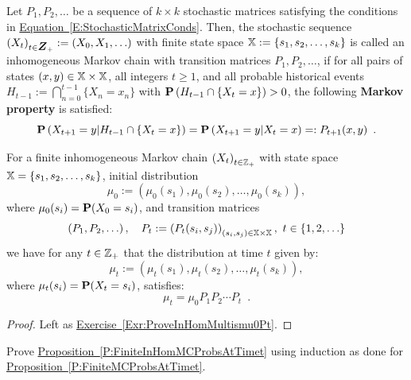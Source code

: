 \begin{definition}\label{D:TimeInhomFiniteMC}
Let $P_1,P_2,\ldots$ be a sequence of $k \times k$ stochastic matrices satisfying the conditions in \hyperref[E:StochasticMatrixConds]{Equation~\ref*{E:StochasticMatrixConds}}.  Then, the stochastic sequence $\left( X_t \right)_{t \in \Z_+} := (X_0,X_1,\ldots)$ with finite state space $\mathbb{X} := \{s_1,s_2,\ldots,s_k\}$ is called an inhomogeneous Markov chain with transition matrices $P_1,P_2,\ldots$, if for all pairs of states $(x,y) \in \mathbb{X} \times \mathbb{X}$, all integers $t \geq 1$, and all probable historical events $H_{t-1} := \bigcap_{n=0}^{t-1} \{ X_n = x_n \}$ with $\mathbf{P}\left(H_{t-1} \cap \{X_t = x\} \right) > 0$, the following {\bf Markov property} is satisfied: 
\begin{equation}\label{E:InHomFiniteMarkovProperty}
\mathbf{P}\left(X_{t+1} = y | H_{t-1} \cap \{X_t = x\} \right)=\mathbf{P}\left(X_{t+1} = y | X_t = x \right) =: P_{t+1}(x,y) \enspace .
\end{equation}
\end{definition}

\begin{prop}\label{P:FiniteInHomMCProbsAtTimet}
For a finite inhomogeneous Markov chain $\left(X_t\right)_{t \in \mathbb{Z}_+}$ with state space $\mathbb{X}=\{s_1,s_2,\ldots,s_k\}$, initial distribution $$\mu_0 := \left( \mu_0(s_1), \mu_0(s_2), \ldots, \mu_0(s_k) \right),$$ where $\mu_0(s_i) = \mathbf{P}(X_0=s_i)$, and transition matrices 
$$\left(P_1,P_2,\ldots\right), \quad P_t := \left(P_t(s_i,s_j)\right)_{(s_i,s_j)\in \mathbb{X}\times \mathbb{X}}, \ t \in \{1,2,\ldots\}$$ we have for any $t \in \mathbb{Z}_+$ that the distribution at time $t$ given by:
$$\mu_t := \left( \mu_t(s_1), \mu_t(s_2), \ldots, \mu_t(s_k) \right),$$
where $\mu_t(s_i) = \mathbf{P}(X_t=s_i)$, satisfies:
\begin{equation}\label{E:InhomMutismu0Pt}
\mu_t = \mu_0 P_1 P_2 \cdots P_t \enspace .
\end{equation}
\begin{proof}
Left as \hyperref[Exr:ProveInHomMultismu0Pt]{Exercise~\ref*{Exr:ProveInHomMultismu0Pt}}.
\end{proof}
\end{prop}

\begin{exercise}\label{Exr:ProveInHomMultismu0Pt}
Prove \hyperref[P:FiniteInHomMCProbsAtTimet]{Proposition~\ref*{P:FiniteInHomMCProbsAtTimet}} using induction as done for \hyperref[P:FiniteMCProbsAtTimet]{Proposition~\ref*{P:FiniteMCProbsAtTimet}}.
\end{exercise}


